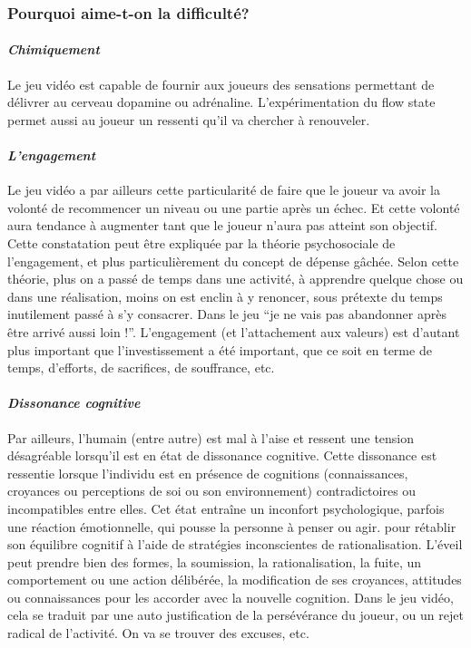 		\subsubsection{Pourquoi aime-t-on la difficulté?}
			\paragraph{\emph{Chimiquement} \\ \quad}
Le jeu vidéo est capable de fournir aux joueurs des sensations permettant de délivrer au cerveau dopamine ou adrénaline. L’expérimentation du flow state permet aussi au joueur un ressenti qu’il va chercher à renouveler.

			\paragraph{\emph{L’engagement} \\ \quad}
Le jeu vidéo a par ailleurs cette particularité de faire que le joueur va avoir la volonté de recommencer un niveau ou une partie après un échec. Et cette volonté aura tendance à augmenter tant que le joueur n’aura pas atteint son objectif. Cette constatation peut être expliquée par la théorie psychosociale de l’engagement, et plus particulièrement du concept de dépense gâchée. Selon cette théorie, plus on a passé de temps dans une activité, à apprendre quelque chose ou dans une réalisation, moins on est enclin à y renoncer, sous prétexte du temps inutilement passé à s’y consacrer. Dans le jeu “je ne vais pas abandonner après être arrivé aussi loin !”. L’engagement (et l’attachement aux valeurs) est d’autant plus important que l’investissement a été important, que ce soit en terme de temps, d’efforts, de sacrifices, de souffrance, etc.

			\paragraph{\emph{Dissonance cognitive} \\ \quad}
Par ailleurs, l’humain (entre autre) est mal à l’aise et ressent une tension désagréable lorsqu’il est en état de dissonance cognitive. Cette dissonance est ressentie lorsque l’individu est en présence de cognitions (connaissances, croyances ou perceptions de soi ou son environnement) contradictoires ou incompatibles entre elles.
Cet état entraîne un inconfort psychologique, parfois une réaction émotionnelle, qui pousse la personne à penser ou agir. pour rétablir son équilibre cognitif à l’aide de stratégies inconscientes de rationalisation. L’éveil peut prendre bien des formes, la soumission, la rationalisation, la fuite, un comportement ou une action délibérée, la modification de ses croyances, attitudes ou connaissances pour les accorder avec la nouvelle cognition. Dans le jeu vidéo, cela se traduit par une auto justification de la persévérance du joueur, ou un rejet radical de l’activité. On va se trouver des excuses, etc.

